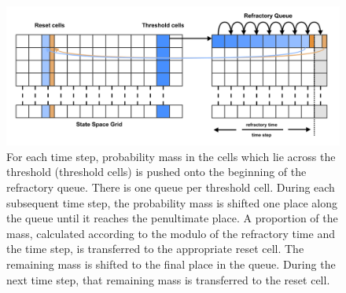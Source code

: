 \documentclass[utf8]{frontiersSCNS} %
\begin{document}
\begin{figure}[!htb]
  \centering
  \includegraphics[width=0.9\columnwidth]{images/reset_grid.pdf}
  \caption{For each time step, probability mass in the cells which lie across the threshold (threshold cells) is pushed onto the beginning of the refractory queue. There is one queue per threshold cell. During each subsequent time step, the probability mass is shifted one place along the queue until it reaches the penultimate place. A proportion of the mass, calculated according to the modulo of the refractory time and the time step, is transferred to the appropriate reset cell. The remaining mass is shifted to the final place in the queue. During the next time step, that remaining mass is transferred to the reset cell.}
  \label{fig:basicreset}
\end{figure}
\end{document}

